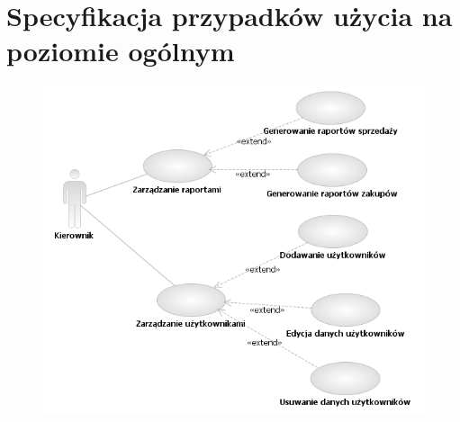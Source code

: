 \section{Specyfikacja przypadków użycia na poziomie ogólnym}

\begin{figure}[h]
    \begin{center}
    \includegraphics[angle=-90,scale=0.8]{../img/kierownikUseCase.png}
    \end{center}
    \label{fig:kierownikUseCase}
\end{figure}
\FloatBarrier

